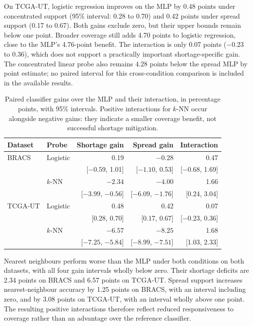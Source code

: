 \noindent On TCGA-UT, logistic regression improves on the MLP by 0.48 points under concentrated support (95\% interval: 0.28 to 0.70) and 0.42 points under spread support (0.17 to 0.67). Both gains exclude zero, but their upper bounds remain below one point. Broader coverage still adds 4.70 points to logistic regression, close to the MLP's 4.76-point benefit. The interaction is only 0.07 points ($-0.23$ to 0.36), which does not support a practically important shortage-specific gain. The concentrated linear probe also remains 4.28 points below the spread MLP by point estimate; no paired interval for this cross-condition comparison is included in the available results.

\begin{table}[htbp]
\centering\small
\setlength{\tabcolsep}{4pt}
\begin{tabular}{@{}llrrr@{}}
\toprule
Dataset & Probe & Shortage gain & Spread gain & Interaction \\
\midrule
BRACS & Logistic & 0.19 & $-0.28$ & 0.47 \\
 & & [$-0.59$, 1.01] & [$-1.10$, 0.53] & [$-0.68$, 1.69] \\
 & $k$-NN & $-2.34$ & $-4.00$ & 1.66 \\
 & & [$-3.99$, $-0.56$] & [$-6.09$, $-1.76$] & [0.24, 3.04] \\
\addlinespace
TCGA-UT & Logistic & 0.48 & 0.42 & 0.07 \\
 & & [0.28, 0.70] & [0.17, 0.67] & [$-0.23$, 0.36] \\
 & $k$-NN & $-6.57$ & $-8.25$ & 1.68 \\
 & & [$-7.25$, $-5.84$] & [$-8.99$, $-7.51$] & [1.03, 2.33] \\
\bottomrule
\end{tabular}
\caption{Paired classifier gains over the MLP and their interaction, in percentage points, with 95\% intervals. Positive interactions for $k$-NN occur alongside negative gains: they indicate a smaller coverage benefit, not successful shortage mitigation.}
\label{tab:results-contrasts}
\end{table}

\noindent Nearest neighbours perform worse than the MLP under both conditions on both datasets, with all four gain intervals wholly below zero. Their shortage deficits are 2.34 points on BRACS and 6.57 points on TCGA-UT. Spread support increases nearest-neighbour accuracy by 1.25 points on BRACS, with an interval including zero, and by 3.08 points on TCGA-UT, with an interval wholly above one point. The resulting positive interactions therefore reflect reduced responsiveness to coverage rather than an advantage over the reference classifier.

